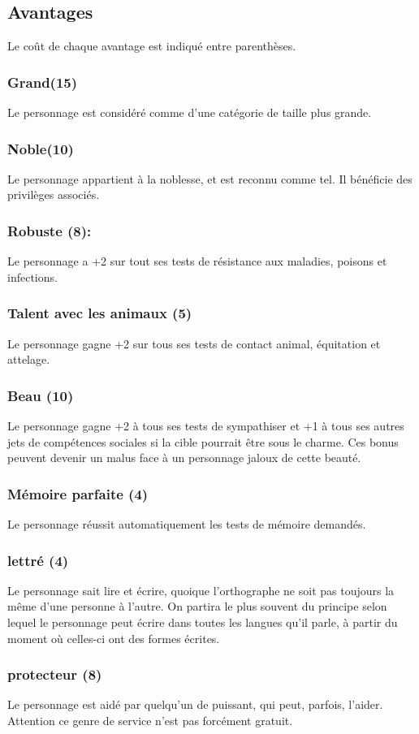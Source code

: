\documentclass[10pt,a4paper,twocolumn]{book}
\begin{document}
\subsection{Avantages}
Le coût de chaque avantage est indiqué entre parenthèses.
\subsubsection{Grand(15)}
Le personnage est considéré comme d’une catégorie de taille plus grande.
\subsubsection{Noble(10) }
Le personnage appartient à la noblesse, et est reconnu comme tel. Il bénéficie des privilèges associés.
\subsubsection{Robuste (8):}
Le personnage a +2 sur tout ses tests de résistance aux maladies, poisons et infections.
\subsubsection{Talent avec les animaux (5)}
Le personnage gagne +2 sur tous ses tests de contact animal, équitation et attelage.
\subsubsection{Beau (10)}
Le personnage gagne +2 à tous ses tests de sympathiser et +1 à tous ses autres jets de compétences sociales si la cible pourrait être sous le charme. Ces bonus peuvent devenir un malus face à un personnage jaloux de cette beauté.
\subsubsection{Mémoire parfaite (4) }
Le personnage réussit automatiquement les tests de mémoire demandés.
\subsubsection{lettré (4) } 
Le personnage sait lire et écrire, quoique l'orthographe ne soit pas toujours la même d'une personne à l'autre. On partira le plus souvent du principe selon lequel le personnage peut écrire dans toutes les langues qu'il parle, à partir du moment où celles-ci ont des formes écrites.
\subsubsection{protecteur (8) }
Le personnage est aidé par quelqu'un de puissant, qui peut, parfois, l'aider. Attention ce genre de service n'est pas forcément gratuit.
\end{document}

